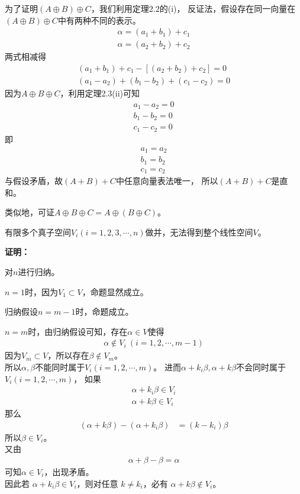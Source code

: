 \documentclass{article}
\begin{document}
\begin{itemize}
        为了证明$(A \oplus B) \oplus C$，我们利用定理2.2的(i)，
        反证法，假设存在同一向量在$(A \oplus B) \oplus C$中有两种不同的表示。
        \begin{align*}
          \alpha = (a_1 + b_1) + c_1 \\
          \alpha = (a_2 + b_2) + c_2
        \end{align*}
        两式相减得
        \begin{align*}
          (a_1 + b_1) + c_1 - [(a_2 + b_2) + c_2] = 0 \\
          (a_1 - a_2) + (b_1 - b_2) + (c_1 - c_2) = 0
        \end{align*}
        因为$A \oplus B \oplus C$，利用定理2.3(ii)可知
        \begin{align*}
          a_1 - a_2 = 0 \\
          b_1 - b_2 = 0 \\
          c_1 - c_2 = 0
        \end{align*}
        即
        \begin{align*}
          a_1 = a_2 \\
          b_1 = b_2 \\
          c_1 = c_2
        \end{align*}
        与假设矛盾，故$(A + B) + C$中任意向量表法唯一，
        所以$(A + B) + C$是直和。
\end{itemize}
类似地，可证$A \oplus B \oplus C = A \oplus (B \oplus C)$。

\begin{zremark}
  有限多个真子空间$V_i (i = 1, 2, 3, \cdots, n)$做并，无法得到整个线性空间$V$。
\end{zremark}

\textbf{证明：}

对$n$进行归纳。

$n = 1$时，因为$V_1 \subset V$，命题显然成立。

归纳假设$n = m - 1$时，命题成立。

$n = m$时，由归纳假设可知，存在$\alpha \in V$使得
\begin{align*}
  \alpha \not \in V_i \ (i = 1, 2, \cdots, m - 1)
\end{align*}
因为$V_m \subset V$，所以存在$\beta \not \in V_m$。\\
所以$\alpha, \beta$不能同时属于$V_i(i = 1, 2, \cdots, m)$。
进而$\alpha + k_i\beta, \alpha + k \beta $不会同时属于$V_i(i = 1, 2, \cdots, m)$，
如果
\begin{align*}
  \alpha + k_i\beta \in V_i \\
  \alpha + k \beta \in V_i
\end{align*}
那么
\begin{align*}
  (\alpha + k \beta) - (\alpha + k_i\beta)
   & = (k - k_i)\beta
\end{align*}
所以$\beta \in V_i$。\\
又由
\begin{align*}
  \alpha + \beta - \beta = \alpha
\end{align*}
可知$\alpha \in V_i$，出现矛盾。\\
因此若 $\alpha + k_i \beta \in V_i$，则对任意 $k \neq k_i$，必有 $\alpha + k\beta \notin V_i$。
\end{document}
